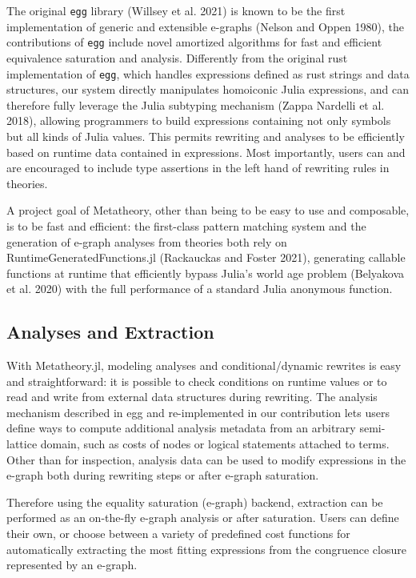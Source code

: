 \documentclass[
]{article}
\begin{document}
The original \texttt{egg} library (Willsey et al. 2021) is known to be
the first implementation of generic and extensible e-graphs (Nelson and
Oppen 1980), the contributions of \texttt{egg} include novel amortized
algorithms for fast and efficient equivalence saturation and analysis.
Differently from the original rust implementation of \texttt{egg}, which
handles expressions defined as rust strings and data structures, our
system directly manipulates homoiconic Julia expressions, and can
therefore fully leverage the Julia subtyping mechanism (Zappa Nardelli
et al. 2018), allowing programmers to build expressions containing not
only symbols but all kinds of Julia values. This permits rewriting and
analyses to be efficiently based on runtime data contained in
expressions. Most importantly, users can and are encouraged to include
type assertions in the left hand of rewriting rules in theories.

A project goal of Metatheory, other than being to be easy to use and
composable, is to be fast and efficient: the first-class pattern
matching system and the generation of e-graph analyses from theories
both rely on RuntimeGeneratedFunctions.jl (Rackauckas and Foster 2021),
generating callable functions at runtime that efficiently bypass Julia's
world age problem (Belyakova et al. 2020) with the full performance of a
standard Julia anonymous function.

\hypertarget{analyses-and-extraction}{%
\subsection{Analyses and Extraction}\label{analyses-and-extraction}}

With Metatheory.jl, modeling analyses and conditional/dynamic rewrites
is easy and straightforward: it is possible to check conditions on
runtime values or to read and write from external data structures during
rewriting. The analysis mechanism described in egg and re-implemented in
our contribution lets users define ways to compute additional analysis
metadata from an arbitrary semi-lattice domain, such as costs of nodes
or logical statements attached to terms. Other than for inspection,
analysis data can be used to modify expressions in the e-graph both
during rewriting steps or after e-graph saturation.

Therefore using the equality saturation (e-graph) backend, extraction
can be performed as an on-the-fly e-graph analysis or after saturation.
Users can define their own, or choose between a variety of predefined
cost functions for automatically extracting the most fitting expressions
from the congruence closure represented by an e-graph.
\end{document}
